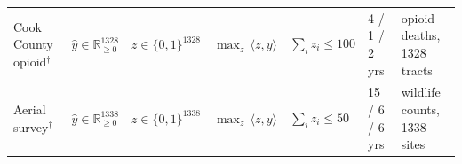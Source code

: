 \begin{table}[t]
{\begin{tabular}{@{}lllllll@{}}
\midrule
Cook County opioid$^\dagger$ & $\hat y\in\mathbb{R}_{\ge 0}^{1328}$ & $z\in\{0,1\}^{1328}$ & $\max_z\,\langle z,y\rangle$ & $\sum_i z_i\le 100$ & 4 / 1 / 2 yrs & opioid deaths, 1328 tracts \\
Aerial survey$^\dagger$ & $\hat y\in\mathbb{R}_{\ge 0}^{1338}$ & $z\in\{0,1\}^{1338}$ & $\max_z\,\langle z,y\rangle$ & $\sum_i z_i\le 50$ & 15 / 6 / 6 yrs & wildlife counts, 1338 sites \\
\bottomrule
\end{tabular}%
}
\end{table}
